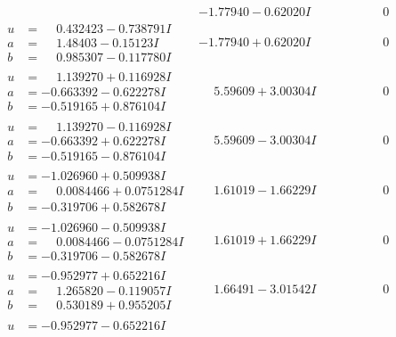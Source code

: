 \documentclass[1p]{elsarticle_modified}
\theoremstyle{definition}
\begin{document}
$$\begin{array}{c|c|c}
 & -1.77940 - 0.62020 I & \phantom{-0.000000 } 0 \\ \hline\begin{aligned}
u &= \phantom{-}0.432423 - 0.738791 I \\
a &= \phantom{-}1.48403 - 0.15123 I \\
b &= \phantom{-}0.985307 - 0.117780 I\end{aligned}
 & -1.77940 + 0.62020 I & \phantom{-0.000000 } 0 \\ \hline\begin{aligned}
u &= \phantom{-}1.139270 + 0.116928 I \\
a &= -0.663392 - 0.622278 I \\
b &= -0.519165 + 0.876104 I\end{aligned}
 & \phantom{-}5.59609 + 3.00304 I & \phantom{-0.000000 } 0 \\ \hline\begin{aligned}
u &= \phantom{-}1.139270 - 0.116928 I \\
a &= -0.663392 + 0.622278 I \\
b &= -0.519165 - 0.876104 I\end{aligned}
 & \phantom{-}5.59609 - 3.00304 I & \phantom{-0.000000 } 0 \\ \hline\begin{aligned}
u &= -1.026960 + 0.509938 I \\
a &= \phantom{-}0.0084466 + 0.0751284 I \\
b &= -0.319706 + 0.582678 I\end{aligned}
 & \phantom{-}1.61019 - 1.66229 I & \phantom{-0.000000 } 0 \\ \hline\begin{aligned}
u &= -1.026960 - 0.509938 I \\
a &= \phantom{-}0.0084466 - 0.0751284 I \\
b &= -0.319706 - 0.582678 I\end{aligned}
 & \phantom{-}1.61019 + 1.66229 I & \phantom{-0.000000 } 0 \\ \hline\begin{aligned}
u &= -0.952977 + 0.652216 I \\
a &= \phantom{-}1.265820 - 0.119057 I \\
b &= \phantom{-}0.530189 + 0.955205 I\end{aligned}
 & \phantom{-}1.66491 - 3.01542 I & \phantom{-0.000000 } 0 \\ \hline\begin{aligned}
u &= -0.952977 - 0.652216 I \\

\end{aligned}
\end{array}$$
\end{document}
